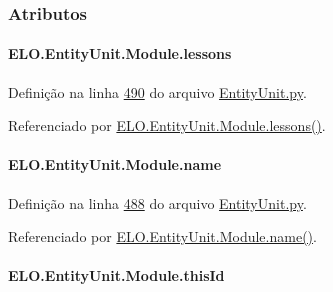 \subsubsection{Atributos}
\hypertarget{classELO_1_1EntityUnit_1_1Module_a33eacfd2527f80841b87ccd73eb5fec0}{
\paragraph[{lessons}]{\setlength{\rightskip}{0pt plus 5cm}E\-L\-O.\-Entity\-Unit.\-Module.\-lessons}}\label{classELO_1_1EntityUnit_1_1Module_a33eacfd2527f80841b87ccd73eb5fec0}


Definição na linha \hyperlink{EntityUnit_8py_source_l00490}{490} do arquivo \hyperlink{EntityUnit_8py_source}{Entity\-Unit.\-py}.



Referenciado por \hyperlink{classELO_1_1EntityUnit_1_1Module_a4b12f83ecbf3722070716c9ca5adb80a}{E\-L\-O.\-Entity\-Unit.\-Module.\-lessons()}.

\hypertarget{classELO_1_1EntityUnit_1_1Module_a82adf3b2602714a4df5f0df535902854}{
\paragraph[{name}]{\setlength{\rightskip}{0pt plus 5cm}E\-L\-O.\-Entity\-Unit.\-Module.\-name}}\label{classELO_1_1EntityUnit_1_1Module_a82adf3b2602714a4df5f0df535902854}


Definição na linha \hyperlink{EntityUnit_8py_source_l00488}{488} do arquivo \hyperlink{EntityUnit_8py_source}{Entity\-Unit.\-py}.



Referenciado por \hyperlink{classELO_1_1EntityUnit_1_1Module_aacb77acc28005833928a7c6f971f44b5}{E\-L\-O.\-Entity\-Unit.\-Module.\-name()}.

\hypertarget{classELO_1_1EntityUnit_1_1Module_a02fe16e41dd435364cb9073a8a805e96}{
\paragraph[{this\-Id}]{\setlength{\rightskip}{0pt plus 5cm}E\-L\-O.\-Entity\-Unit.\-Module.\-this\-Id}}\label{classELO_1_1EntityUnit_1_1Module_a02fe16e41dd435364cb9073a8a805e96}


